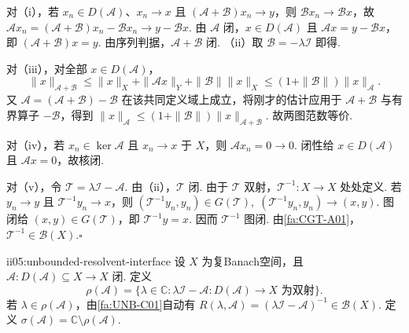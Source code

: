 \begin{FAProof}
对（i），若 \(\displaystyle x_n\in D(\mathcal A)\)、\(\displaystyle x_n\to x\) 且 \(\displaystyle(\mathcal A+\mathcal B)x_n\to y\)，则 \(\displaystyle\mathcal Bx_n\to\mathcal Bx\)，故
\(\displaystyle \mathcal Ax_n =(\mathcal A+\mathcal B)x_n-\mathcal Bx_n \longrightarrow y-\mathcal Bx.\)
由 \(\displaystyle\mathcal A\) 闭，\(\displaystyle x\in D(\mathcal A)\) 且 \(\displaystyle\mathcal Ax=y-\mathcal Bx\)，即 \(\displaystyle(\mathcal A+\mathcal B)x=y\). 由序列判据，\(\displaystyle\mathcal A+\mathcal B\) 闭. （ii）取 \(\displaystyle\mathcal B=-\lambda\mathcal I\) 即得.

对（iii），对全部 \(\displaystyle x\in D(\mathcal A)\)，
\[
\|x\|_{\mathcal A+\mathcal B}
\leqslant
\|x\|_X+\|\mathcal Ax\|_Y+\|\mathcal B\|\|x\|_X
\leqslant
(1+\|\mathcal B\|)\|x\|_{\mathcal A}.
\]
又 \(\displaystyle\mathcal A=(\mathcal A+\mathcal B)-\mathcal B\) 在该共同定义域上成立，将刚才的估计应用于 \(\displaystyle\mathcal A+\mathcal B\) 与有界算子 \(\displaystyle-\mathcal B\)，得到
\(\displaystyle \|x\|_{\mathcal A} \leqslant (1+\|\mathcal B\|)\|x\|_{\mathcal A+\mathcal B}.\)
故两图范数等价.

对（iv），若 \(\displaystyle x_n\in\ker\mathcal A\) 且 \(\displaystyle x_n\to x\) 于 \(\displaystyle X\)，则 \(\displaystyle\mathcal Ax_n=0\to0\). 闭性给 \(\displaystyle x\in D(\mathcal A)\) 且 \(\displaystyle\mathcal Ax=0\)，故核闭.

对（v），令 \(\displaystyle\mathcal T=\lambda\mathcal I-\mathcal A\). 由（ii），\(\displaystyle\mathcal T\) 闭. 由于 \(\displaystyle\mathcal T\) 双射，\(\displaystyle\mathcal T^{-1}:X\to X\) 处处定义. 若 \(\displaystyle y_n\to y\) 且 \(\displaystyle\mathcal T^{-1}y_n\to x\)，则
\(\displaystyle (\mathcal T^{-1}y_n,y_n)\in G(\mathcal T), \; (\mathcal T^{-1}y_n,y_n)\to(x,y).\)
图闭给 \(\displaystyle(x,y)\in G(\mathcal T)\)，即 \(\displaystyle\mathcal T^{-1}y=x\). 因而 \(\displaystyle\mathcal T^{-1}\) 图闭. 由\autoref{fa:CGT-A01}，\(\displaystyle\mathcal T^{-1}\in\mathcal B(X)\).\hfill\(\square\)
\end{FAProof}

\begin{FADefinition}[C][闭算子的最小预解接口]{ii05:unbounded-resolvent-interface}
设 \(\displaystyle X\) 为复Banach空间，且
\(\displaystyle \mathcal A:D(\mathcal A)\subseteq X\to X\)
闭. 定义
\[
\rho(\mathcal A)
=
\{\lambda\in\mathbb C:\lambda\mathcal I-\mathcal A:D(\mathcal A)\to X\text{ 为双射}\}.
\]
若 \(\displaystyle\lambda\in\rho(\mathcal A)\)，由\autoref{fa:UNB-C01}自动有
\(\displaystyle R(\lambda,\mathcal A) =(\lambda\mathcal I-\mathcal A)^{-1}\in\mathcal B(X).\)
定义 \(\displaystyle\sigma(\mathcal A)=\mathbb C\setminus\rho(\mathcal A)\).
\end{FADefinition}

